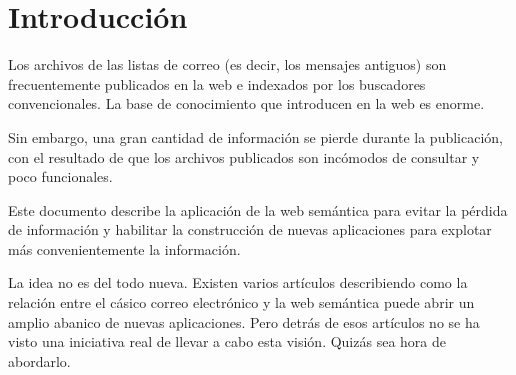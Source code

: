 
\section{Introducción}

Los archivos de las listas de correo (es decir, los mensajes antiguos) son
frecuentemente publicados en la web e indexados por los buscadores convencionales.
La base de conocimiento que introducen en la web es enorme.

Sin embargo, una gran cantidad de información se pierde durante la publicación,
con el resultado de que los archivos publicados son incómodos de consultar
y poco funcionales.

Este documento describe la aplicación de la web semántica para evitar la
pérdida de información y habilitar la construcción de nuevas aplicaciones
para explotar más convenientemente la información.

La idea no es del todo nueva\cite{Luke2004}. Existen varios artículos
describiendo como la relación entre el cásico correo electrónico y la
web semántica puede abrir un amplio abanico de nuevas aplicaciones. Pero
detrás de esos artículos no se ha visto una iniciativa real de llevar a
cabo esta visión. Quizás sea hora de abordarlo.
